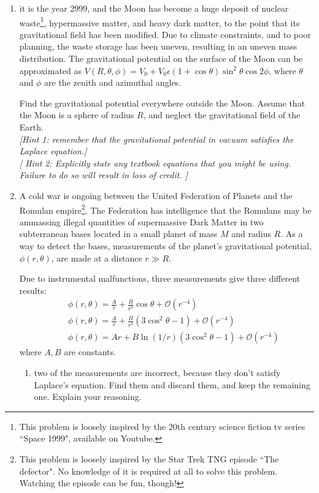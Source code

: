 \documentclass[fleqn]{article}
\begin{document}
\begin{enumerate}
    \item it is the year 2999, and the Moon has become a huge deposit of nuclear waste\footnote{This problem is loosely inspired by the 20th century science fiction tv series ``Space 1999", available on Youtube.}, hypermassive matter, and heavy dark matter, to the point that its gravitational field has been modified.   Due to climate constraints, and to poor planning, the waste storage has been uneven, resulting in an uneven mass distribution.    The gravitational potential on the surface of the Moon
          can be approximated as $V(R,\theta,\phi)=V_0 + V_0 \epsilon (1+\cos \theta)\sin^2\theta \cos2\phi $, where $\theta$ and $\phi$ are the zenith and azimuthal angles. 
          
          Find the gravitational potential everywhere outside the Moon. Assume that the Moon is a sphere of radius $R$, and neglect the gravitational field of the Earth.  \\
          {\it [Hint 1: remember that the gravitational potential in vacuum satisfies the Laplace equation.]}\\
          {\it  [ Hint 2: Explicitly state any textbook equations that you might be using. Failure to do so will result in loss of credit.  ]}
          
    
    \item A cold war is ongoing between the United Federation of Planets and the Romulan empire\footnote{This problem is loosely inspired by the Star Trek TNG episode ``The defector". No knowledge of it is required at all to solve this problem. Watching the episode can be fun, though! }. 
    The Federation has intelligence that the Romulans may be ammassing illegal quantities of supermassive Dark Matter in
    two subterranean bases located in a small planet of mass $M$ and radius $R$. As a way to detect the bases, measurements of the planet's gravitational potential, $\phi(r,\theta)$, are made at a distance $r \gg R$. 
    
    Due to instrumental malfunctions, three measurements give three different results: 
    \begin{eqnarray}
      &&\phi(r,\theta)=  \frac{A}{r} +  \frac{B}{r^3}\cos\theta  + {\mathcal O}(r^{-4})
      \nonumber\\
      &&\phi(r,\theta)=  \frac{A}{r} +   \frac{B}{r^3} (3 \cos^2\theta - 1) + {\mathcal O}(r^{-4}) 
      \nonumber\\
      &&\phi(r,\theta)=  A r+  B \ln(1/r) (3 \cos^2\theta - 1)+ {\mathcal O}(r^{-4}) \nonumber
    \end{eqnarray}
    where $A,B$ are constants. 
      \begin{enumerate}
        \item two of the measurements are incorrect, because they don't satisfy Laplace's equation.  Find them and discard them, and keep the remaining one.  Explain your reasoning.
        

\end{enumerate}
\end{enumerate}
\end{document}
